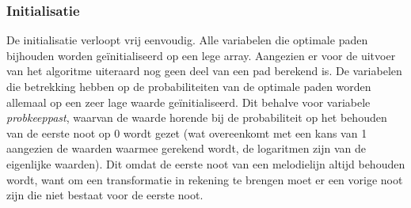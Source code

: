 \subsubsection{Initialisatie}
De initialisatie verloopt vrij eenvoudig. Alle variabelen die optimale paden bijhouden worden ge\"initialiseerd op een lege array. Aangezien er voor de uitvoer van het algoritme uiteraard nog geen deel van een pad berekend is. De variabelen die betrekking hebben op de probabiliteiten van de optimale paden worden allemaal op een zeer lage waarde ge\"initialiseerd. Dit behalve voor variabele \textit{prob\textunderscore keep\textunderscore past}, waarvan de waarde horende bij de probabiliteit op het behouden van de eerste noot op 0 wordt gezet (wat overeenkomt met een kans van 1 aangezien de waarden waarmee gerekend wordt, de logaritmen zijn van de eigenlijke waarden). Dit omdat de eerste noot van een melodielijn altijd behouden wordt, want om een transformatie in rekening te brengen moet er een vorige noot zijn die niet bestaat voor de eerste noot.

